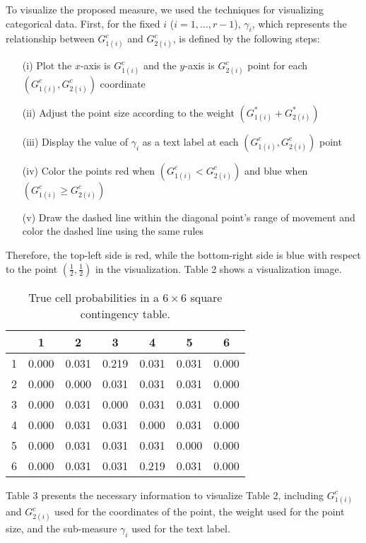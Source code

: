 \documentclass[a4j,12pt]{article}
\begin{document}
To visualize the proposed measure, we used the techniques for visualizing categorical data. 
First, for the fixed $i$ ($i=1, \ldots, r-1$), $\gamma_i$, which represents the relationship between $G^c_{1(i)}$ and $G^c_{2(i)}$, is defined by the following steps:
\begin{enumerate}
\item[(i)] Plot the $x$-axis is $G^c_{1(i)}$ and the $y$-axis is $G^c_{2(i)}$ point for each $\left( G^c_{1(i)}, G^c_{2(i)} \right)$ coordinate
\item[(ii)] Adjust the point size according to the weight $\left( G^{\ast}_{1(i)} + G^{\ast}_{2(i)} \right)$ 
\item[(iii)] Display the value of $\gamma_i$ as a text label at each $\left( G^c_{1(i)}, G^c_{2(i)} \right)$ point
\item[(iv)] Color the points red when $\left(G^c_{1(i)} < G^c_{2(i)}\right)$ and blue when $\left( G^c_{1(i)} \geq G^c_{2(i)}\right)$
\item[(v)] Draw the dashed line within the diagonal point’s range of movement and color the dashed line using the same rules
\end{enumerate}
Therefore, the top-left side is red, while the bottom-right side is blue with respect to the point $\left( \frac{1}{2}, \frac{1}{2} \right)$ in the visualization. 
Table 2 shows a visualization image.
\begin{table}[h]
\small\sf\centering
\caption{True cell probabilities in a $6 \times 6$ square contingency table.\label{T2}}
\begin{tabular}[!bh]{ccccccc} \hline
	& 1	 	& 2 		& 3		& 4		& 5		& 6		\\ \hline
1	& 0.000	& 0.031	& 0.219	& 0.031	& 0.031	& 0.000	\\
2	& 0.000	& 0.000 	& 0.031	& 0.031	& 0.031	& 0.000	\\
3	& 0.000	& 0.031	& 0.000	& 0.031	& 0.031	& 0.000	\\
4	& 0.000	& 0.031	& 0.031	& 0.000	& 0.031	& 0.000	\\
5	& 0.000	& 0.031	& 0.031	& 0.031	& 0.000	& 0.000	\\
6	& 0.000	& 0.031	& 0.031	& 0.219	& 0.031	& 0.000	\\ \hline
\end{tabular}
\end{table}
Table 3 presents the necessary information to visualize Table 2, including $G^c_{1(i)}$ and $G^c_{2(i)}$ used for the coordinates of the point, the weight used for the point size, and the sub-measure $\gamma_i$ used for the text label.
\end{document}
